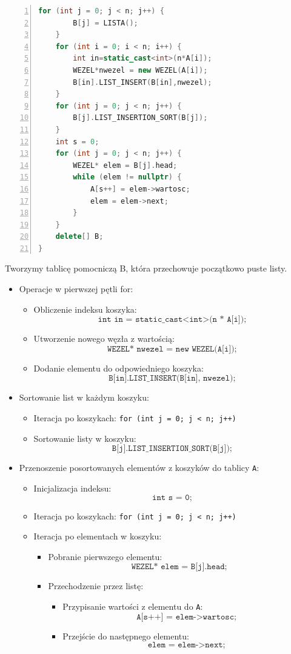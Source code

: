 \documentclass{article}
\begin{document}
{\begin{lstlisting}[language=C++, caption={Kod funkcji sortowania kubełkowego}, numbers=left, frame=single, xleftmargin=5pt, xrightmargin=5pt]
	for (int j = 0; j < n; j++) {
		B[j] = LISTA();
	}
	for (int i = 0; i < n; i++) {
		int in=static_cast<int>(n*A[i]);
		WEZEL*nwezel = new WEZEL(A[i]);
		B[in].LIST_INSERT(B[in],nwezel);
	}
	for (int j = 0; j < n; j++) {
		B[j].LIST_INSERTION_SORT(B[j]);
	}
	int s = 0;
	for (int j = 0; j < n; j++) {
		WEZEL* elem = B[j].head;
		while (elem != nullptr) {
			A[s++] = elem->wartosc;
			elem = elem->next;
		}
	}
	delete[] B;
}
\end{lstlisting}

\large{Tworzymy tablicę pomocniczą B, która przechowuje początkowo puste listy.}
\begin{itemize}
	\item Operacje w pierwszej pętli for:
	\begin{itemize}
		\item Obliczenie indeksu koszyka: \[ \texttt{int in = static\_cast<int>(n * A[i]);} \]
		\item Utworzenie nowego węzła z wartością: \[ \texttt{WEZEL* nwezel = new WEZEL(A[i]);} \]
		\item Dodanie elementu do odpowiedniego koszyka: \[ \texttt{B[in].LIST\_INSERT(B[in], nwezel);} \]
	\end{itemize}
\end{itemize}

\begin{itemize}
	\item Sortowanie list w każdym koszyku:
	\begin{itemize}
		\item Iteracja po koszykach: \texttt{for (int j = 0; j < n; j++)}
		\item Sortowanie listy w koszyku: \[ \texttt{B[j].LIST\_INSERTION\_SORT(B[j]);} \]
	\end{itemize}
	\item Przenoszenie posortowanych elementów z koszyków do tablicy \texttt{A}:
	\begin{itemize}
		\item Inicjalizacja indeksu: \[ \texttt{int s = 0;} \]
		\item Iteracja po koszykach: \texttt{for (int j = 0; j < n; j++)}
		\item Iteracja po elementach w koszyku:
		\begin{itemize}
			\item Pobranie pierwszego elementu: \[ \texttt{WEZEL* elem = B[j].head;} \]
			\item Przechodzenie przez listę:
			\begin{itemize}
				\item Przypisanie wartości z elementu do \texttt{A}: \[ \texttt{A[s++] = elem->wartosc;} \]
				\item Przejście do następnego elementu: \[ \texttt{elem = elem->next;} \]
			\end{itemize}
		\end{itemize}
	\end{itemize}
\end{itemize}

}
\end{document}
